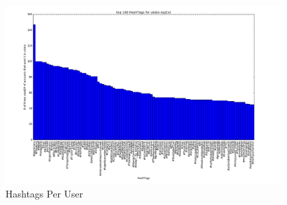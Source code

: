 \documentclass{sig-alternate-05-2015}
\begin{document}
\begin{figure}
	\caption{Hashtags Per User}
	\centering
		\includegraphics[width=0.95\textwidth]{imgs/bhvc}
\end{figure}

\end{document}
